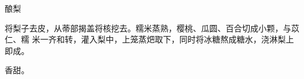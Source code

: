 %
%
%
%
%
%
%
\begin{recipe}{酿梨}

\ingredients


\preparation

将梨子去皮，从蒂部揭盖将核挖去。糯米蒸熟，樱桃、瓜圆、百合切成小颗，与苡仁、糯
米一齐和转，灌入梨中，上笼蒸𤆵取下，同时将冰糖熬成糖水，浇淋梨上即成。

\features

香甜。

\end{recipe}

